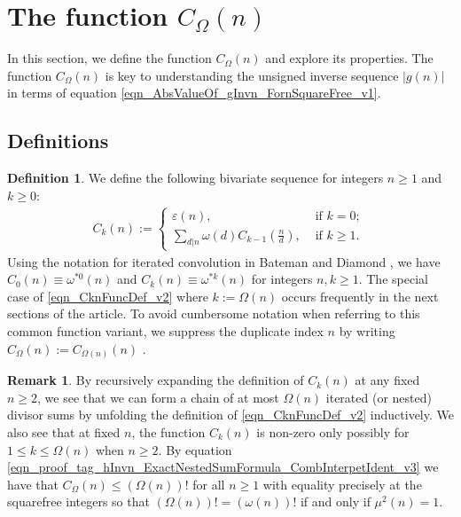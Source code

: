 \documentclass[11pt,reqno,a4letter]{article}
\numberwithin{equation}{section}
\numberwithin{figure}{section}
\numberwithin{table}{section}
\newcommand{\seqnum}[1]{\href{http://oeis.org/#1}{\color{ProcessBlue}{\underline{#1}}}}
\theoremstyle{plain}
\numberwithin{theorem}{section}
\theoremstyle{definition}
\newtheorem{remark}[theorem]{Remark}
\newtheorem{definition}[theorem]{Definition}
\theoremstyle{remark}
\begin{document}
\section{The function $C_{\Omega}(n)$} 
\label{Section_NewFormulasForgInvn_v1} 

In this section, we define the function 
$C_{\Omega}(n)$ and explore its properties. 
The function $C_{\Omega}(n)$ is key to understanding the 
unsigned inverse sequence $|g(n)|$ in terms of equation 
\eqref{eqn_AbsValueOf_gInvn_FornSquareFree_v1}. 

\subsection{Definitions}

\begin{definition}
We define the following bivariate sequence for integers $n \geq 1$ and $k \geq 0$: 
\begin{align} 
\label{eqn_CknFuncDef_v2} 
C_k(n) := \begin{cases} 
     \varepsilon(n), & \text{ if $k = 0$; } \\ 
     \sum\limits_{d|n} \omega(d) C_{k-1}\left(\frac{n}{d}\right), & \text{ if $k \geq 1$. } 
     \end{cases} 
\end{align} 
Using the notation for iterated convolution in 
Bateman and Diamond \cite[Def.~2.3; \S 2]{ANT-BATEMAN-DIAMOND}, we have 
$C_0(n) \equiv \omega^{\ast 0}(n)$ and $C_k(n) \equiv \omega^{\ast k}(n)$ for 
integers $n, k \geq 1$. 
The special case of \eqref{eqn_CknFuncDef_v2} where 
$k := \Omega(n)$ occurs frequently in the next sections of the 
article. To avoid cumbersome notation when referring to this common function variant, we suppress the 
duplicate index $n$ by writing $C_{\Omega}(n) := C_{\Omega(n)}(n)$ \cite[\seqnum{A008480}]{OEIS}. 
\end{definition}

\begin{remark}
By recursively expanding the definition of $C_k(n)$ 
at any fixed $n \geq 2$, we see that 
we can form a chain of at most $\Omega(n)$ iterated (or nested) divisor sums by 
unfolding the definition of \eqref{eqn_CknFuncDef_v2} inductively. 
We also see that at fixed $n$, the function 
$C_k(n)$ is non-zero only possibly for 
$1 \leq k \leq \Omega(n)$ when $n \geq 2$. 
By equation \eqref{eqn_proof_tag_hInvn_ExactNestedSumFormula_CombInterpetIdent_v3} we have 
that $C_{\Omega}(n) \leq (\Omega(n))!$ for all $n \geq 1$ with 
equality precisely at the squarefree integers so that 
$(\Omega(n))! = (\omega(n))!$ if and only if $\mu^2(n) = 1$. 
\end{remark}
\end{document}
